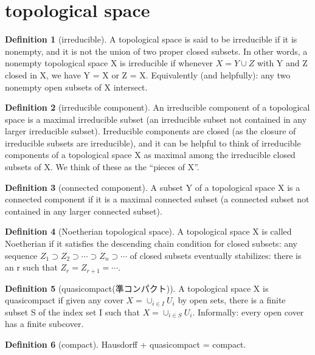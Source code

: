 \documentclass{article}
\theoremstyle{definition} %
\newtheorem{definition}{Definition}[section] %
\theoremstyle{plain} %
\theoremstyle{remark} %
\begin{document}
\section{topological space}
\begin{definition}[irreducible]
  A topological space is said to be irreducible if it is nonempty, and it is not
the union of two proper closed subsets. In other words, a nonempty topological
space X is irreducible if whenever $X = Y \cup Z$ with Y and Z closed in X, we have
Y = X or Z = X. Equivalently (and helpfully): any two nonempty open subsets of
X intersect.
\end{definition}


\begin{definition}[irreducible component]
An irreducible component of a topological space is a maximal irreducible subset (an irreducible subset not contained in any larger irreducible subset). Irreducible components are closed (as the closure of irreducible subsets are irreducible), and it can be helpful to think of irreducible components of a
topological space X as maximal among the irreducible closed subsets of X. We think
of these as the “pieces of X”.
\end{definition}

\begin{definition}[connected component]
  A subset Y of a topological space X is a connected component if it is a maximal connected subset (a connected subset not contained in any larger connected subset).
\end{definition}

\begin{definition}[Noetherian topological space]
  A topological space X is called Noetherian if it satisfies the descending chain condition for closed subsets: any sequence $Z_1 \supset Z_2 \supset \cdots \supset Z_n \supset \cdots$ of closed subsets eventually stabilizes: there is an r such that $Z_r = Z_{r+1} = \cdots $.
\end{definition}

\begin{definition}[quasicompact(準コンパクト)]
  A topological space X is quasicompact if given any cover $X = \cup_{i \in I} U_i$ by open sets, there is a finite subset S of the index set I such that $X = \cup_{i \in S}U_i$.
  Informally: every open cover has a finite subcover.
\end{definition}

\begin{definition}[compact]
Hausdorff + quasicompact = compact.
\end{definition}
\end{document}
